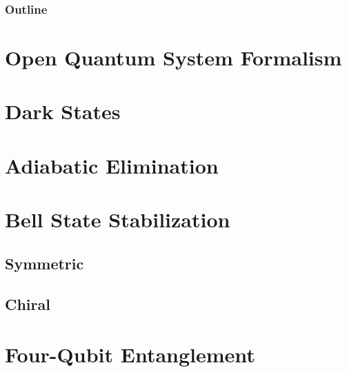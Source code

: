 \documentclass{beamer}
\begin{document}
\begin{frame}
\frametitle{Outline}
\tableofcontents
\section{Open Quantum System Formalism}
\section{Dark States}
\section{Adiabatic Elimination}
\section{Bell State Stabilization}
\subsection{Symmetric}
\subsection{Chiral}
\section{Four-Qubit Entanglement}

\end{frame}
\end{document}
